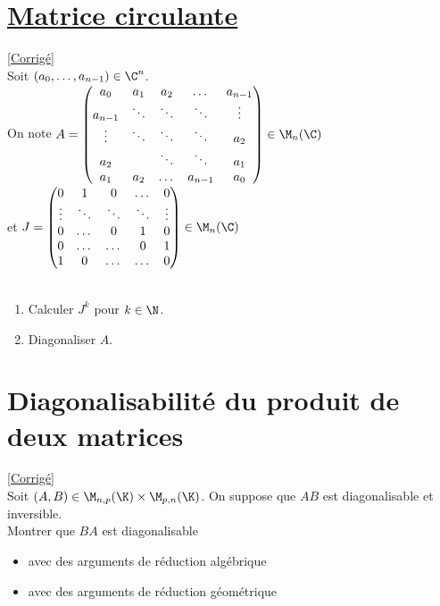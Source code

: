 \documentclass[8pt]{book}
\begin{document}
	\section{\underline{Matrice circulante} }
	\label{Matrice circulante}
	\textcolor{blue}{\hyperref[Matrice circulante corrigé]{[Corrigé]}}\\
	Soit $(a_0,\dots,a_{n-1})\in \C^n$.\\
	On note $A=
	\begin{pmatrix}
		a_0&a_1&a_2&\dots&a_{n-1}\\
		a_{n-1}&\ddots&\ddots&\ddots&\vdots\\
		\vdots&\ddots&\ddots&\ddots&a_2\\
		a_2&\ &\ddots&\ddots&a_1\\
		a_1&a_2&\dots&a_{n-1}&a_0
	\end{pmatrix}\in \M_n(\C)$
	\\et $J=
	\begin{pmatrix}
		0&1&0&\dots&0\\
		\vdots&\ddots&\ddots&\ddots&\vdots\\
		0&\dots&0&1&0\\
		0&\dots&\dots&0&1\\
		1&0&\dots&\dots&0
	\end{pmatrix}\in \M_n(\C)$\\\\
	\begin{enumerate}
		\item Calculer $J^k$ pour $k\in \N$.
		\item Diagonaliser $A$.
	\end{enumerate}
	
	\section{Diagonalisabilité du produit de deux matrices }
	\label{Diagonalisabilité du produit de deux matrices}
	\textcolor{blue}{\hyperref[Diagonalisabilité du produit de deux matrices corrigé]{[Corrigé]}}\\
	Soit $(A,B)\in \M_{n,p}(\K)\times \M_{p,n}(\K)$. On suppose que $AB$ est diagonalisable et inversible.\\
	Montrer que $BA$ est diagonalisable
	\begin{itemize}
		\item avec des arguments de réduction algébrique
		\item avec des arguments de réduction géométrique
	\end{itemize}
	
\end{document}
